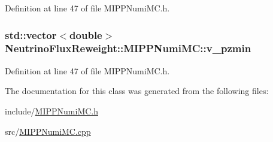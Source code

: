 Definition at line 47 of file M\-I\-P\-P\-Numi\-M\-C.\-h.

\hypertarget{class_neutrino_flux_reweight_1_1_m_i_p_p_numi_m_c_af6796ed5716ee06589ab1ba6e09fcd82}{
\subsubsection[{v\-\_\-pzmin}]{\setlength{\rightskip}{0pt plus 5cm}std\-::vector$<$double$>$ Neutrino\-Flux\-Reweight\-::\-M\-I\-P\-P\-Numi\-M\-C\-::v\-\_\-pzmin\hspace{0.3cm}{\ttfamily [private]}}}\label{class_neutrino_flux_reweight_1_1_m_i_p_p_numi_m_c_af6796ed5716ee06589ab1ba6e09fcd82}


Definition at line 47 of file M\-I\-P\-P\-Numi\-M\-C.\-h.



The documentation for this class was generated from the following files\-:\begin{DoxyCompactItemize}
\item 
include/\hyperlink{_m_i_p_p_numi_m_c_8h}{M\-I\-P\-P\-Numi\-M\-C.\-h}\item 
src/\hyperlink{_m_i_p_p_numi_m_c_8cpp}{M\-I\-P\-P\-Numi\-M\-C.\-cpp}\end{DoxyCompactItemize}
